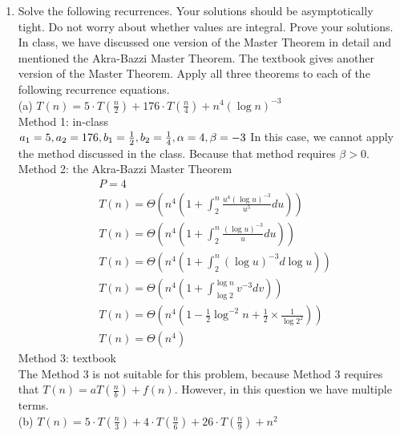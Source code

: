 \documentclass[12pt,letterpaper]{article}
\begin{document}
\begin{enumerate}
\item %

Solve the following recurrences. Your solutions should be asymptotically tight. Do not worry about whether values are integral. Prove your solutions.\\

In class, we have discussed one version of the Master Theorem in detail and mentioned the Akra-Bazzi Master Theorem. The textbook gives another version of the Master Theorem. Apply all three theorems to each of the following recurrence equations. \\

(a) $T(n) = 5 \cdot T(\frac{n}{2}) + 176 \cdot T(\frac{n}{4}) + n^4 (\log n) ^ {-3}$ \\

Method 1: in-class \\
$ a_1 = 5, a_2 = 176, b_1 = \frac{1}{2}, b_2 = \frac{1}{4}, \alpha = 4, \beta = -3 \\ $
In this case, we cannot apply the method discussed in the class. Because that method requires $ \beta > 0 $. \\
Method 2: the Akra-Bazzi Master Theorem
\begin{align*}
& P = 4 \\
& T(n) = \Theta(n^4 (1 + \int_{2}^{n} \frac{u^4(\log u)^{-3}}{u^5} du ) ) \\
& T(n) = \Theta(n^4 (1 + \int_{2}^{n} \frac{(\log u)^{-3}}{u} du ) ) \\
& T(n) = \Theta(n^4 (1 + \int_{2}^{n} (\log u) ^{-3} d \log u ) ) \\
& T(n) = \Theta(n^4 (1 + \int_{\log 2}^{\log n} v^{-3} dv ) ) \\
& T(n) = \Theta( n^4 (1 - \frac{1}{2} \log ^{-2} n + \frac{1}{2} \times \frac{1}{\log 2^{2}} ) ) \\
& T(n) = \Theta(n^4)
\end{align*}
Method 3: textbook \\
The Method 3 is not suitable for this problem, because Method 3 requires that $T(n) = aT(\frac{n}{b}) + f(n)$. However, in this question we have multiple terms. \\

(b) $T(n) = 5 \cdot T(\frac{n}{3}) + 4 \cdot T(\frac{n}{6}) + 26 \cdot T(\frac{n}{9}) + n^2$ \\


\end{enumerate}
\end{document}
